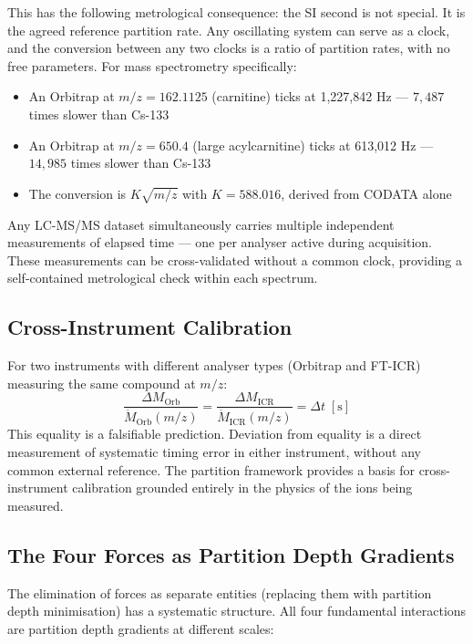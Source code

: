 This has the following metrological consequence: the SI second is not special.
It is the agreed reference partition rate. Any oscillating system can serve as a
clock, and the conversion between any two clocks is a ratio of partition rates,
with no free parameters. For mass spectrometry specifically:
\begin{itemize}
    \item An Orbitrap at $m/z = 162.1125$ (carnitine) ticks at
          1,227,842 Hz --- $7{,}487$ times slower than Cs-133
    \item An Orbitrap at $m/z = 650.4$ (large acylcarnitine) ticks at
          613,012 Hz --- $14{,}985$ times slower than Cs-133
    \item The conversion is $K\sqrt{m/z}$ with $K = 588.016$, derived
          from CODATA alone
\end{itemize}
Any LC-MS/MS dataset simultaneously carries multiple independent measurements of
elapsed time --- one per analyser active during acquisition. These measurements
can be cross-validated without a common clock, providing a self-contained
metrological check within each spectrum.

\subsection{Cross-Instrument Calibration}
\label{subsec:cross_calibration}

For two instruments with different analyser types (Orbitrap and FT-ICR)
measuring the same compound at $m/z$:
\begin{equation}
    \frac{\Delta M_{\mathrm{Orb}}}{\dot{M}_{\mathrm{Orb}}(m/z)} =
    \frac{\Delta M_{\mathrm{ICR}}}{\dot{M}_{\mathrm{ICR}}(m/z)} = \Delta t
    \;\mathrm{[s]}
    \label{eq:cross_calibration}
\end{equation}
This equality is a falsifiable prediction. Deviation from equality is a direct
measurement of systematic timing error in either instrument, without any common
external reference. The partition framework provides a basis for cross-instrument
calibration grounded entirely in the physics of the ions being measured.

\subsection{The Four Forces as Partition Depth Gradients}
\label{subsec:forces}

The elimination of forces as separate entities (replacing them with partition
depth minimisation) has a systematic structure. All four fundamental interactions
are partition depth gradients at different scales:

